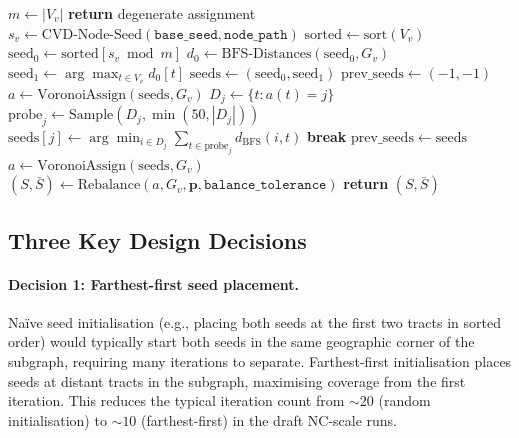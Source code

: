 \begin{algorithm}[t]
\caption{\cvd{}-\textsc{Bisect}($G_v$, $k_L$, $k_R$, $\mathtt{base\_seed}$,
  $\mathtt{node\_path}$, $\mathtt{cvd\_iters}$, $\mathtt{balance\_tolerance}$)}
\label{alg:cvd}
\begin{algorithmic}[1]
\State $m \gets |V_v|$
  \textbf{return} degenerate assignment 
\EndIf
\State $s_v \gets \mathrm{CVD\text{-}Node\text{-}Seed}(\mathtt{base\_seed}, \mathtt{node\_path})$
\State $\mathrm{sorted} \gets \mathrm{sort}(V_v)$
\State $\mathrm{seed}_0 \gets \mathrm{sorted}[s_v \bmod m]$
\State $d_0 \gets \mathrm{BFS\text{-}Distances}(\mathrm{seed}_0, G_v)$
\State $\mathrm{seed}_1 \gets \arg\max_{t \in V_v} d_0[t]$
\State $\mathrm{seeds} \gets (\mathrm{seed}_0, \mathrm{seed}_1)$
\State $\mathrm{prev\_seeds} \gets (-1, -1)$
  \State $a \gets \mathrm{VoronoiAssign}(\mathrm{seeds}, G_v)$
    \State $D_j \gets \{t : a(t) = j\}$
    \State $\mathrm{probe}_j \gets \mathrm{Sample}(D_j, \min(50, |D_j|))$
    \State $\mathrm{seeds}[j] \gets \arg\min_{i \in D_j}
           \sum_{t \in \mathrm{probe}_j} d_{\mathrm{BFS}}(i, t)$
  \EndFor
    \textbf{break}
  \EndIf
  \State $\mathrm{prev\_seeds} \gets \mathrm{seeds}$
\EndFor
\State $a \gets \mathrm{VoronoiAssign}(\mathrm{seeds}, G_v)$
\State $(S, \bar{S}) \gets \mathrm{Rebalance}(a, G_v, \mathbf{p}, \mathtt{balance\_tolerance})$
\State \textbf{return} $(S, \bar{S})$
\end{algorithmic}
\end{algorithm}

\subsection{Three Key Design Decisions}

\paragraph{Decision 1: Farthest-first seed placement.}
Na\"{i}ve seed initialisation (e.g., placing both seeds at the first two tracts
in sorted order) would typically start both seeds in the same geographic corner
of the subgraph, requiring many iterations to separate.
Farthest-first initialisation places seeds at distant tracts in the subgraph,
maximising coverage from the first iteration.
This reduces the typical iteration count from $\sim 20$ (random initialisation)
to $\sim 10$ (farthest-first) in the draft NC-scale runs.

